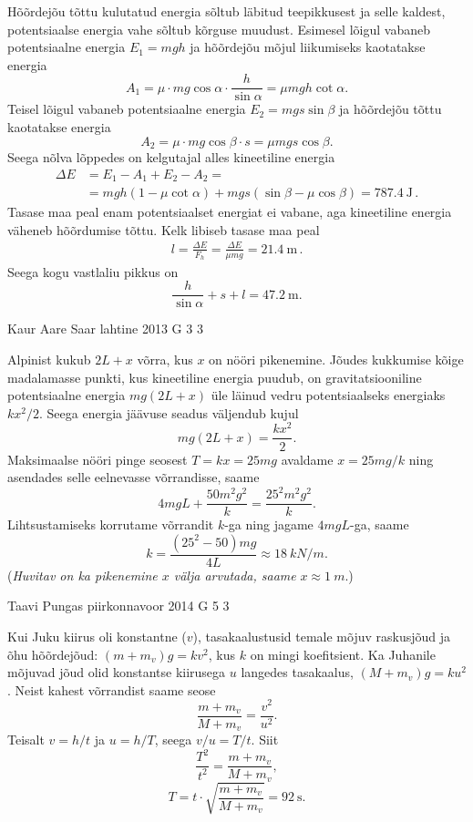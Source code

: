 \documentclass[11pt]{article}
\begin{document}
{{\ifSolution
Hõõrdejõu tõttu kulutatud energia sõltub läbitud teepikkusest ja selle kaldest, potentsiaalse energia vahe sõltub kõrguse muudust. Esimesel lõigul vabaneb potentsiaalne energia \(E_1 = mgh\) ja hõõrdejõu mõjul liikumiseks kaotatakse energia
\[
A_1 = \mu \cdot mg\cos\alpha \cdot \frac{h}{\sin\alpha} = \mu mgh \cot\alpha.
\]
Teisel lõigul vabaneb potentsiaalne energia \(E_2 = mgs \sin\beta\) ja hõõrdejõu tõttu kaotatakse energia
\[
A_2 = \mu \cdot mg \cos \beta \cdot s = \mu mgs \cos \beta.
\]
Seega nõlva lõppedes on kelgutajal alles kineetiline energia
\begin{align*}
\Delta E &= E_1 - A_1 + E_2 - A_2 = \\
&= mgh(1-\mu\cot\alpha) + mgs(\sin\beta - \mu\cos\beta) = \SI{787.4}{\joule} \, .
\end{align*}
Tasase maa peal enam potentsiaalset energiat ei vabane, aga kineetiline energia väheneb hõõrdumise tõttu. Kelk libiseb tasase maa peal
\begin{align*}
l = \frac{\Delta E}{F_h} = \frac{\Delta E}{\mu mg} = \SI{21.4}{\meter} \, .
\end{align*}
Seega kogu vastlaliu pikkus on
\[
\frac{h}{\sin\alpha} + s + l = \SI{47.2}{\meter}.
\]
\fi
}

{Kaur Aare Saar} %
{lahtine} %
{2013} %
{G 3} %
{3} %
{

\ifSolution
Alpinist kukub $2L+x$ võrra, kus $x$ on nööri pikenemine. Jõudes kukkumise kõige madalamasse punkti, kus kineetiline energia puudub, on gravitatsiooniline potentsiaalne energia $mg(2L+x)$ üle läinud vedru potentsiaalseks energiaks $kx^2/2$. Seega energia jäävuse seadus väljendub kujul
\[mg(2L+x)=\frac{kx^2}{2}.\]
Maksimaalse nööri pinge seosest $T=kx=25mg$ avaldame $x=25mg/k$ ning asendades selle eelnevasse võrrandisse, saame
\[4mgL+\frac{50m^2g^2}{k}=\frac{25^2m^2g^2}{k}.\]
Lihtsustamiseks korrutame võrrandit $k$-ga ning jagame $4mgL$-ga, saame
\[k=\frac{(25^2-50)mg}{4L}\approx \SI{18}{kN/m}.\]
({\em Huvitav on ka pikenemine $x$ välja arvutada, saame} $x\approx \SI{1}{m}$.)
\fi
}

{Taavi Pungas} %
{piirkonnavoor} %
{2014} %
{G 5} %
{3} %
{

\ifSolution
Kui Juku kiirus oli konstantne ($v$), tasakaalustusid temale mõjuv raskusjõud ja õhu hõõrdejõud: $(m+m_v)g=kv^2$, kus $k$ on mingi koefitsient. Ka Juhanile mõjuvad jõud olid konstantse kiirusega $u$ langedes tasakaalus, $(M+m_v)g=ku^2$. Neist kahest võrrandist saame seose \[\frac{m+m_v}{M+m_v}=\frac{v^2}{u^2}.\] Teisalt $v=h/t$ ja $u=h/T$, seega $v/u=T/t$. Siit
\[\frac{T^2}{t^2}=\frac{m+m_v}{M+m_v},\]
\[T=t \cdot \sqrt{\frac{m+m_v}{M+m_v}}=\SI{92}{\s}.\]
\fi
}

}
\end{document}
